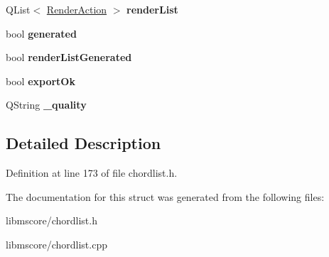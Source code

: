 \begin{DoxyCompactItemize}
Q\+List$<$ \hyperlink{struct_ms_1_1_render_action}{Render\+Action} $>$ {\bfseries render\+List}
\item 
\mbox{\label{struct_ms_1_1_chord_description_a726cab7f1f1665bbb31e7e7c1858b2c1}} 
bool {\bfseries generated}
\item 
\mbox{\label{struct_ms_1_1_chord_description_af52d56eeabaf10c1cc5343c5cdc5be23}} 
bool {\bfseries render\+List\+Generated}
\item 
\mbox{\label{struct_ms_1_1_chord_description_a65931c672448e10bef9e8c1252532649}} 
bool {\bfseries export\+Ok}
\item 
\mbox{\label{struct_ms_1_1_chord_description_a0ce0e2a7e61d13678bf719f0cae01235}} 
Q\+String {\bfseries \+\_\+quality}
\end{DoxyCompactItemize}


\subsection{Detailed Description}


Definition at line 173 of file chordlist.\+h.



The documentation for this struct was generated from the following files\+:\begin{DoxyCompactItemize}
\item 
libmscore/chordlist.\+h\item 
libmscore/chordlist.\+cpp\end{DoxyCompactItemize}
